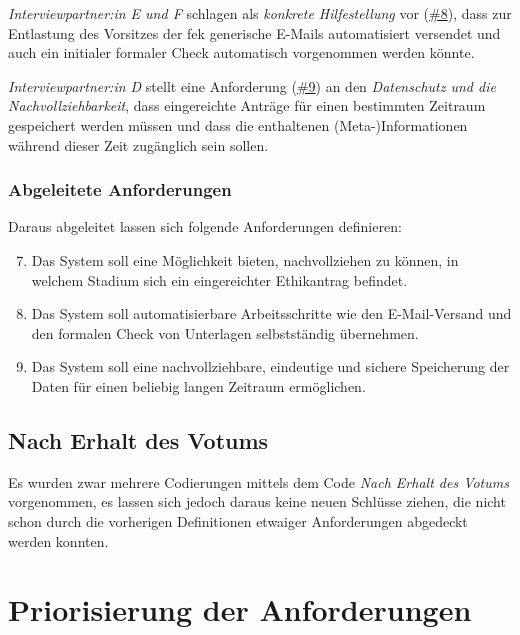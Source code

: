 \documentclass[a4paper,12pt,twoside]{scrreprt}
\begin{document}
\medskip

\textit{Interviewpartner:in E und F} schlagen als \textit{konkrete Hilfestellung} vor (\hyperref[tab:anforderungen-nach-einreichung]{\#8}), dass zur Entlastung des Vorsitzes der \ac{fek} generische E-Mails automatisiert versendet und auch ein initialer formaler Check automatisch vorgenommen werden könnte.

\medskip

\textit{Interviewpartner:in D} stellt eine Anforderung (\hyperref[tab:anforderungen-nach-einreichung]{\#9}) an den \textit{Datenschutz und die Nachvollziehbarkeit}, dass eingereichte Anträge für einen bestimmten Zeitraum gespeichert werden müssen und dass die enthaltenen (Meta-)Informationen während dieser Zeit zugänglich sein sollen.

\subsubsection*{Abgeleitete Anforderungen}
\label{sub-sub-sec:abgeleitete-anforderungen-nach-einreichung}

Daraus abgeleitet lassen sich folgende Anforderungen definieren:
\begin{enumerate}[label=\textbf{\#\arabic*}]
    \setcounter{enumi}{6}
    \item Das System soll eine Möglichkeit bieten, nachvollziehen zu können, in welchem Stadium sich ein eingereichter Ethikantrag befindet.
    \item Das System soll automatisierbare Arbeitsschritte wie den E-Mail-Versand und den formalen Check von Unterlagen selbstständig übernehmen.
    \item Das System soll eine nachvollziehbare, eindeutige und sichere Speicherung der Daten für einen beliebig langen Zeitraum ermöglichen.
\end{enumerate}

\subsection{Nach Erhalt des Votums}
\label{sub-sec:nach-erhalt-votum}

Es wurden zwar mehrere Codierungen mittels dem Code \textit{Nach Erhalt des Votums} vorgenommen, es lassen sich jedoch daraus keine neuen Schlüsse ziehen, die nicht schon durch die vorherigen Definitionen etwaiger Anforderungen abgedeckt werden konnten.

\section{Priorisierung der Anforderungen}
\label{sec:priorisierung-anforderungen}
\end{document}
